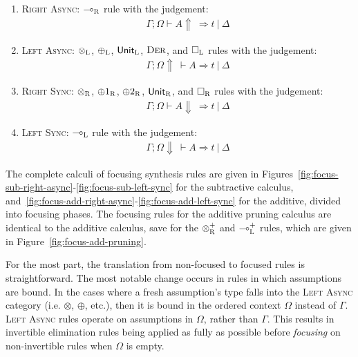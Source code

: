 \begin{enumerate}
  \item \textsc{Right Async}: $\multimap_{\textsc{R}}$ rule with the judgement:
        \begin{align*}\Gamma ; \Omega \vdash A \Uparrow\ \Rightarrow t\ |\ \Delta \end{align*}
        \item \textsc{Left Async}:  $\otimes_{\textsc{L}}$, $\oplus_{\textsc{L}}$, $\mathsf{Unit}_{\textsc{L}}$, $\textsc{Der}$, and $\Box_{\textsc{L}}$ rules with the judgement:
        \begin{align*}\Gamma ; \Omega \Uparrow\ \vdash A \Rightarrow t\ |\ \Delta \end{align*}
        \item \textsc{Right Sync}:  $\otimes_{\textsc{R}}$, $\oplus1_{\textsc{R}}$, $\oplus2_{\textsc{R}}$, $\mathsf{Unit}_{\textsc{R}}$, and $\Box_{\textsc{R}}$ rules with the judgement:
        \begin{align*}\Gamma ; \Omega \vdash A \Downarrow\ \Rightarrow t\ |\ \Delta \end{align*}
        \item \textsc{Left Sync}:   $\multimap_{\textsc{L}}$ rule with the judgement:
        \begin{align*}\Gamma ; \Omega \Downarrow\ \vdash A \Rightarrow t\ |\ \Delta \end{align*}
\end{enumerate}

The complete calculi of focusing synthesis rules are given in
Figures~\ref{fig:focus-sub-right-async}-\ref{fig:focus-sub-left-sync} for the
subtractive calculus,
and~\ref{fig:focus-add-right-async}-\ref{fig:focus-add-left-sync} for the
additive, divided into focusing phases. The focusing rules for the additive
pruning calculus are identical to the additive calculus, save for the
$\otimes^{+}_{\textsc{R}}$ and $\multimap^{+}_{\textsc{L}}$ rules, which are
given in Figure~\ref{fig:focus-add-pruning}.

For the most part, the translation from non-focused to focused rules is
straightforward. The most notable change occurs in rules in which assumptions
are bound. In the cases where a fresh assumption's type falls into the \textsc{Left
Async} category (i.e. $\otimes$, $\oplus$, etc.), then it is bound in the ordered
context $\Omega$ instead of $\Gamma$. \textsc{Left Async} rules operate on assumptions in
$\Omega$, rather than $\Gamma$. This results in invertible elimination rules
being applied as fully as possible before \textit{focusing} on non-invertible
rules when $\Omega$ is empty.  

